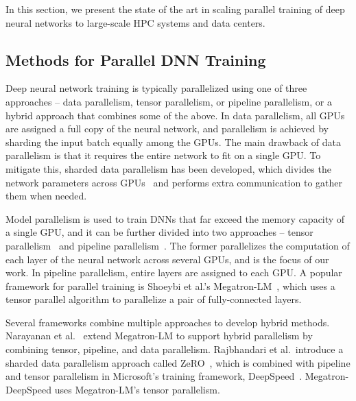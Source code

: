 

In this section, we present the state of the art in scaling parallel training
of deep neural networks to large-scale HPC systems and data centers.

\subsection{Methods for Parallel DNN Training}
\label{sec:sota-distrain} 

Deep neural network training is typically parallelized using one of three
approaches -- data parallelism, tensor parallelism, or pipeline parallelism, or
a hybrid approach that combines some of the above.  In data parallelism, all
GPUs are assigned a full copy of the neural network, and parallelism is
achieved by sharding the input batch equally among the GPUs.  The main drawback
of data parallelism is that it requires the entire network to fit on a single
GPU. To mitigate this, sharded data parallelism has been developed, which
divides the network parameters across GPUs~\cite{sc2020zero,fsdp, wang2024zero}
and performs extra communication to gather them when needed.

Model parallelism is used to train DNNs that far exceed the memory capacity of
a single GPU, and it can be further divided into two approaches -- tensor
parallelism~\cite{megatronlm} and pipeline
parallelism~\cite{huang2019gpipe_nips, megatronlm-2}.
The former parallelizes
the computation of each layer of the neural network across several GPUs, and is
the focus of our work.  In pipeline parallelism, entire layers are assigned to
each GPU.  A popular framework for parallel training is Shoeybi et
al.'s Megatron-LM~\cite{megatronlm}, which uses a tensor parallel algorithm to
parallelize a pair of fully-connected layers.

Several frameworks combine multiple approaches to develop hybrid
methods. Narayanan et al.~\cite{megatronlm-2} extend Megatron-LM to support
hybrid parallelism by combining tensor, pipeline, and data parallelism.
Rajbhandari et al.~introduce a sharded data parallelism approach called ZeRO~\cite{sc2020zero},
which is combined with pipeline and tensor parallelism in Microsoft's training
framework, DeepSpeed~\cite{deepspeed-extreme-3d, singh:ics2023}.
Megatron-DeepSpeed uses Megatron-LM's tensor 
parallelism.

